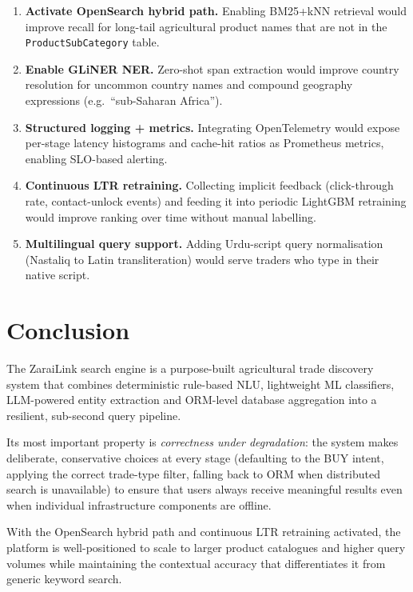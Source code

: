 \documentclass[12pt,a4paper]{article}
\begin{document}
\begin{enumerate}
  \item \textbf{Activate OpenSearch hybrid path.}
        Enabling BM25+kNN retrieval would improve recall for long-tail agricultural
        product names that are not in the \texttt{ProductSubCategory} table.

  \item \textbf{Enable GLiNER NER.}
        Zero-shot span extraction would improve country resolution for uncommon country
        names and compound geography expressions (e.g.\ ``sub-Saharan Africa'').

  \item \textbf{Structured logging + metrics.}
        Integrating OpenTelemetry would expose per-stage latency histograms and
        cache-hit ratios as Prometheus metrics, enabling SLO-based alerting.

  \item \textbf{Continuous LTR retraining.}
        Collecting implicit feedback (click-through rate, contact-unlock events) and
        feeding it into periodic LightGBM retraining would improve ranking over time
        without manual labelling.

  \item \textbf{Multilingual query support.}
        Adding Urdu-script query normalisation (Nastaliq to Latin transliteration) would
        serve traders who type in their native script.
\end{enumerate}

\section{Conclusion}

The ZaraiLink search engine is a purpose-built agricultural trade discovery system that
combines deterministic rule-based NLU, lightweight ML classifiers, LLM-powered entity
extraction and ORM-level database aggregation into a resilient, sub-second query
pipeline.

Its most important property is \emph{correctness under degradation}: the system makes
deliberate, conservative choices at every stage (defaulting to the BUY intent, applying
the correct trade-type filter, falling back to ORM when distributed search is
unavailable) to ensure that users always receive meaningful results even when individual
infrastructure components are offline.

With the OpenSearch hybrid path and continuous LTR retraining activated, the platform is
well-positioned to scale to larger product catalogues and higher query volumes while
maintaining the contextual accuracy that differentiates it from generic keyword search.

\end{document}
